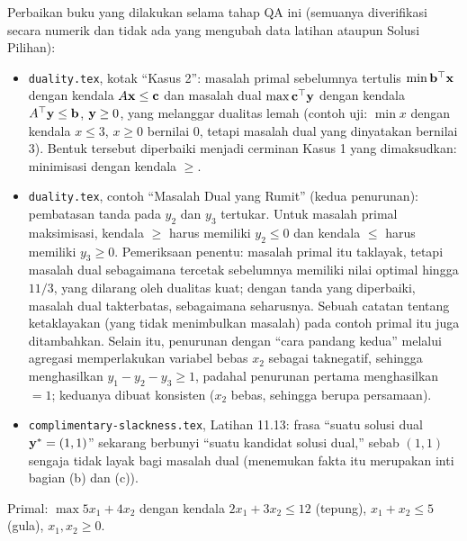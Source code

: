 \begin{qaflag}
Perbaikan buku yang dilakukan selama tahap QA ini (semuanya diverifikasi secara numerik dan tidak ada yang mengubah data latihan ataupun Solusi Pilihan):
\begin{itemize}
\item \texttt{duality.tex}, kotak ``Kasus 2'': masalah primal sebelumnya tertulis $\min \mathbf{b}^\top \mathbf{x}$ dengan kendala $A\mathbf{x} \le \mathbf{c}$ dan masalah dual $\max \mathbf{c}^\top \mathbf{y}$ dengan kendala $A^\top\mathbf{y} \le \mathbf{b}$, $\mathbf{y} \ge 0$, yang melanggar dualitas lemah (contoh uji: $\min x$ dengan kendala $x \le 3$, $x \ge 0$ bernilai $0$, tetapi masalah dual yang dinyatakan bernilai $3$). Bentuk tersebut diperbaiki menjadi cerminan Kasus 1 yang dimaksudkan: minimisasi dengan kendala $\geq$.
\item \texttt{duality.tex}, contoh ``Masalah Dual yang Rumit'' (kedua penurunan): pembatasan tanda pada $y_2$ dan $y_3$ tertukar. Untuk masalah primal maksimisasi, kendala $\geq$ harus memiliki $y_2 \le 0$ dan kendala $\leq$ harus memiliki $y_3 \ge 0$. Pemeriksaan penentu: masalah primal itu taklayak, tetapi masalah dual sebagaimana tercetak sebelumnya memiliki nilai optimal hingga $11/3$, yang dilarang oleh dualitas kuat; dengan tanda yang diperbaiki, masalah dual takterbatas, sebagaimana seharusnya. Sebuah catatan tentang ketaklayakan (yang tidak menimbulkan masalah) pada contoh primal itu juga ditambahkan. Selain itu, penurunan dengan ``cara pandang kedua'' melalui agregasi memperlakukan variabel bebas $x_2$ sebagai taknegatif, sehingga menghasilkan $y_1 - y_2 - y_3 \ge 1$, padahal penurunan pertama menghasilkan $= 1$; keduanya dibuat konsisten ($x_2$ bebas, sehingga berupa persamaan).
\item \texttt{complimentary-slackness.tex}, Latihan 11.13: frasa ``suatu solusi dual $\mathbf{y}^* = (1,1)$'' sekarang berbunyi ``suatu kandidat solusi dual,'' sebab $(1,1)$ sengaja tidak layak bagi masalah dual (menemukan fakta itu merupakan inti bagian (b) dan (c)).
\end{itemize}
\end{qaflag}


Primal: $\max 5x_1 + 4x_2$ dengan kendala $2x_1 + 3x_2 \le 12$ (tepung), $x_1 + x_2 \le 5$ (gula), $x_1, x_2 \ge 0$.

